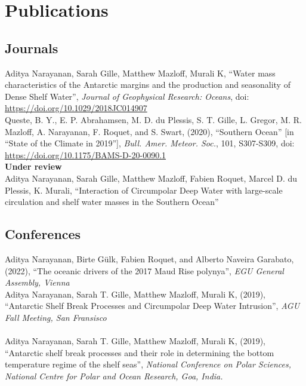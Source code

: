\documentclass[12pt, a4paper]{article}
\newcommand{\years}[1]{\marginnote{\small #1}}
\begin{document}
\section*{Publications}

\subsection*{\bf Journals}
\years{2019}Aditya Narayanan, Sarah Gille, Matthew Mazloff, Murali K, ``Water mass characteristics of the Antarctic margins and the production and seasonality of Dense Shelf Water'', \emph{Journal of Geophysical Research: Oceans}, doi: \url{https://doi.org/10.1029/2018JC014907}\\
\years{2020} Queste, B. Y., E. P. Abrahamsen, M. D. du Plessis, S. T. Gille, L. Gregor, M. R. Mazloff, A. Narayanan, F. Roquet, and S. Swart, (2020), ``Southern Ocean'' [in ``State of the Climate in 2019''], \emph{Bull. Amer. Meteor. Soc.}, 101, S307-S309, doi: \url{https://doi.org/10.1175/BAMS-D-20-0090.1}\\

{\bf Under review}\\

\years{}Aditya Narayanan, Sarah Gille, Matthew Mazloff, Fabien Roquet, Marcel D. du Plessis, K. Murali, ``Interaction of Circumpolar Deep Water with large-scale circulation and shelf water masses in the Southern Ocean''\\


\subsection*{\bf Conferences}
\years{2022}Aditya Narayanan, Birte G\"ulk, Fabien Roquet, and Alberto Naveira Garabato, (2022), ``The oceanic drivers of the 2017 Maud Rise polynya'', \emph{EGU General Assembly, Vienna}\\
\years{2019}Aditya Narayanan, Sarah T. Gille, Matthew Mazloff, Murali K, (2019), ``Antarctic Shelf Break Processes and Circumpolar Deep Water Intrusion'', \emph{AGU Fall Meeting, San Fransisco}\\
\\
\years{2019}Aditya Narayanan, Sarah T. Gille, Matthew Mazloff, Murali K, (2019), ``Antarctic shelf break processes and their role in determining the bottom temperature regime of the shelf seas'', \emph{National Conference on Polar Sciences, National Centre for Polar and Ocean Research, Goa, India.}\\
\end{document}
